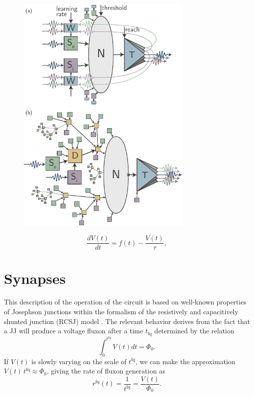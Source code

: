 \documentclass[twocolumn]{article}
\begin{document}
\begin{figure}[h!]
\includegraphics[width=8.6cm]{figures/_fig__schematics.pdf}
\end{figure}

\begin{equation}
\label{eq:leaky_integrator}
\frac{dV(t)}{dt} = f(t)-\frac{V(t)}{\tau},
\end{equation}


\section{\label{sec:synapses}Synapses}


This description of the operation of the circuit is based on well-known properties of Josephson junctions within the formalism of the resistively and capacitively shunted junction (RCSJ) model \cite{vatu1998,ka1999,ti1996}. The relevant behavior derives from the fact that a JJ will produce a voltage fluxon after a time $t_{\mathrm{fq}}$ determined by the relation
\begin{equation}
\label{eq:jj__fluxon_production}
\int_0^{t^{\mathrm{fq}}}V(t)dt = \Phi_0.
\end{equation}
If $V(t)$ is slowly varying on the scale of $t^{\mathrm{fq}}$, we can make the approximation $V(t)\,t^{\mathrm{fq}} \approx \Phi_0$, giving the rate of fluxon generation as
\begin{equation}
\label{eq:jj__fluxon_rate}
r^{\mathrm{fq}}(t) =  \frac{1}{t^{\mathrm{fq}}} = \frac{V(t)}{\Phi_0}.
\end{equation}
\end{document}
